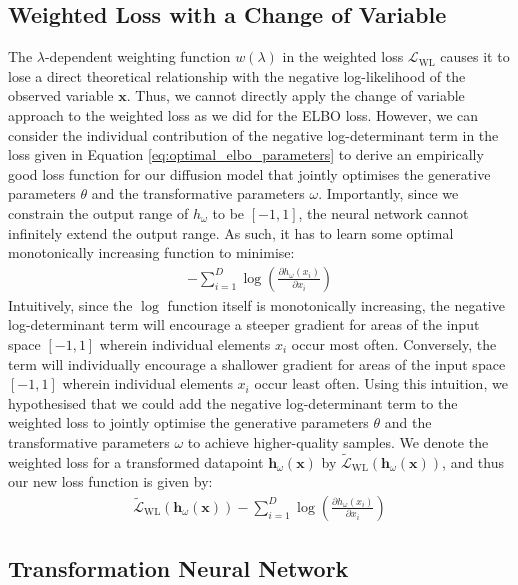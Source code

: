 \documentclass[ oneside,%
                    author={George Herbert},
                    degree={MSci},
                     title={Video Diffusion Models for Climate Simulations},
                  subtitle={}]{dissertation}
\begin{document}
\subsection{Weighted Loss with a Change of Variable}

The $\lambda$-dependent weighting function $w(\lambda)$ in the weighted loss $\mathcal{L}_{\mathrm{WL}}$ causes it to lose a direct theoretical relationship with the negative log-likelihood of the observed variable $\mathbf{x}$. Thus, we cannot directly apply the change of variable approach to the weighted loss as we did for the ELBO loss. However, we can consider the individual contribution of the negative log-determinant term in the loss given in Equation \ref{eq:optimal_elbo_parameters} to derive an empirically good loss function for our diffusion model that jointly optimises the generative parameters $\theta$ and the transformative parameters $\omega$. Importantly, since we constrain the output range of $h_\omega$ to be $[-1,1]$, the neural network cannot infinitely extend the output range. As such, it has to learn some optimal monotonically increasing function to minimise:
\begin{align}
      -\sum_{i=1}^D \log \left(\frac{\partial h_\omega(x_i)}{\partial x_i}\right)
\end{align}
Intuitively, since the $\log$ function itself is monotonically increasing, the negative log-determinant term will encourage a steeper gradient for areas of the input space $[-1, 1]$ wherein individual elements $x_i$ occur most often. Conversely, the term will individually encourage a shallower gradient for areas of the input space $[-1, 1]$ wherein individual elements $x_i$ occur least often. Using this intuition, we hypothesised that we could add the negative log-determinant term to the weighted loss to jointly optimise the generative parameters $\theta$ and the transformative parameters $\omega$ to achieve higher-quality samples. We denote the weighted loss for a transformed datapoint $\mathbf{h}_\omega(\mathbf{x})$ by $\tilde{\mathcal{L}}_{\mathrm{WL}}(\mathbf{h}_\omega(\mathbf{x}))$, and thus our new loss function is given by:
\begin{align}
      \tilde{\mathcal{L}}_{\mathrm{WL}}(\mathbf{h}_\omega(\mathbf{x})) - \sum_{i=1}^D \log \left(\frac{\partial h_\omega(x_i)}{\partial x_i}\right)\label{eq:weighted_loss_transform}
\end{align}

\subsection{Transformation Neural Network}
\end{document}
